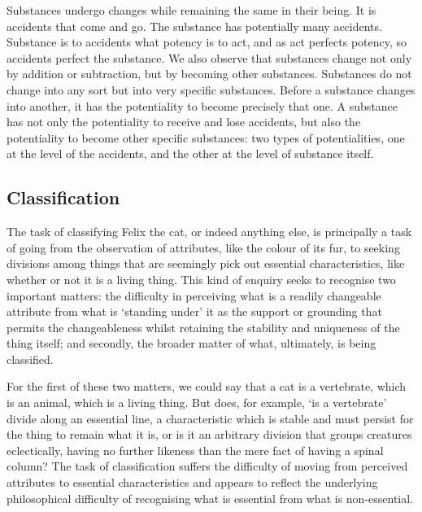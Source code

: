 \begin{quoting}
Substances undergo changes while remaining the same in their being. It is accidents that come and go. The substance has potentially many accidents. Substance is to accidents what potency is to act, and as act perfects potency, so accidents perfect the substance. We also observe that substances change not only by addition or subtraction, but by becoming other substances. Substances do not change into any sort but into very specific substances. Before a substance changes into another, it has the potentiality to become precisely that one. A substance has not only the potentiality to receive and lose accidents, but also the potentiality to become other specific substances: two types of potentialities, one at the level of the accidents, and the other at the level of substance itself.
\parencite[][49]{de1981christian}
\end{quoting}

\subsection{Classification}

The task of classifying Felix the cat, or indeed anything else, is principally a task of going from the observation of attributes, like the colour of its fur, to seeking divisions among things that are seemingly pick out essential characteristics, like whether or not it is a living thing. This kind of enquiry seeks to recognise two important matters: the difficulty in perceiving what is a readily changeable attribute from what is `standing under' it as the support or grounding that permits the changeableness whilst retaining the stability and uniqueness of the thing itself; and secondly, the broader matter of what, ultimately, is being classified.

For the first of these two matters, we could say that a cat is a vertebrate, which is an animal, which is a living thing. But does, for example, `is a vertebrate' divide along an essential line, a characteristic which is stable and must persist for the thing to remain what it is, or is it an arbitrary division that groups creatures eclectically, having no further likeness than the mere fact of having a spinal column? The task of classification suffers the difficulty of moving from perceived attributes to essential characteristics and appears to reflect the underlying philosophical difficulty of recognising what is essential from what is non-essential.

